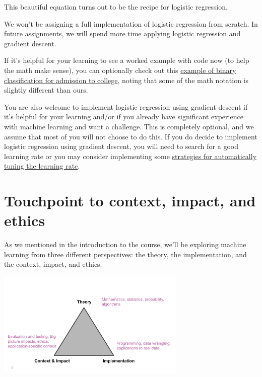 \documentclass[assignment04_Solutions]{subfiles}
\begin{document}
This beautiful equation turns out to be the recipe for logistic regression. \\

\begin{notice}
We won't be assigning a full implementation of logistic regression from scratch. In future assignments, we will spend more time applying logistic regression and gradient descent. 

If it's helpful for your learning to see a worked example with code now (to help the math make sense), you can optionally check out this \href{https://towardsdatascience.com/building-a-logistic-regression-in-python-301d27367c24}{example of binary classification for admission to college}, noting that some of the math notation is slightly different than ours. 

You are also welcome to implement logistic regression using gradient descent if it's helpful for your learning and/or if you already have significant experience with machine learning and want a challenge. This is completely optional, and we assume that most of you will not choose to do this. If you do decide to implement logistic regression using gradient descent, you will need to search for a good learning rate or you may consider implementing some \href{https://towardsdatascience.com/gradient-descent-algorithms-and-adaptive-learning-rate-adjustment-methods-79c701b086be}{strategies for automatically tuning the learning rate}.


\end{notice}





\section{Touchpoint to context, impact, and ethics}

As we mentioned in the introduction to the course, we'll be exploring machine learning from three different perspectives: the theory, the implementation, and the context, impact, and ethics. 

\includegraphics[height=2in]{figures/ternaryTIE}
\end{document}
